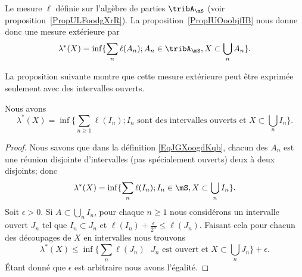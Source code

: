 Le mesure \( \ell\) définie sur l'algèbre de parties \( \tribA_{\mS}\) (voir proposition~\ref{PropULFoodgXrR}). La proposition~\ref{PropIUOoobjfIB} nous donne donc une mesure extérieure par
\begin{equation}    \label{EqJGXoogdKqb}
    \lambda^*(X)=\inf\{ \sum_n\ell(A_n);A_n\in\tribA_{\mS},X\subset\bigcup_nA_n \}.
\end{equation}

La proposition suivante montre que cette mesure extérieure peut être exprimée seulement avec des intervalles ouverts.
\begin{proposition} \label{PropTNOooDcfwn}
    Nous avons
    \begin{equation}
        \lambda^*(X)=\inf\{ \sum_{n\geq 1}\ell(I_n); I_n\text{ sont des intervalles ouverts et }X\subset\bigcup_nI_n \}.
    \end{equation}
\end{proposition}

\begin{proof}
    Nous savons que dans la définition \eqref{EqJGXoogdKqb}, chacun des \( A_n\) est une réunion disjointe d'intervalles (pas spécialement ouverts) deux à deux disjoints; donc
    \begin{equation}
        \lambda^*(X)=\inf\{ \sum_n\ell(I_n);I_n\in\mS,X\subset\bigcup_nI_n \}.
    \end{equation}
    Soit \( \epsilon>0\). Si \( A\subset\bigcup_nI_n\), pour chaque \( n\geq 1\) nous considérons un intervalle ouvert \( J_n\) tel que \( I_n\subset J_n\) et \( \ell(I_n)+\frac{ \epsilon }{ 2^n }\leq \ell(J_n)\). Faisant cela pour chacun des découpages de \( X\) en intervalles nous trouvons
    \begin{equation}
        \lambda^*(X)\leq \inf\{ \sum_n\ell(J_n)\text{ } J_n\text{ est ouvert et }X\subset\bigcup_nJ_n \}+\epsilon.
    \end{equation}
    Étant donné que \( \epsilon\) est arbitraire nous avons l'égalité.
\end{proof}

